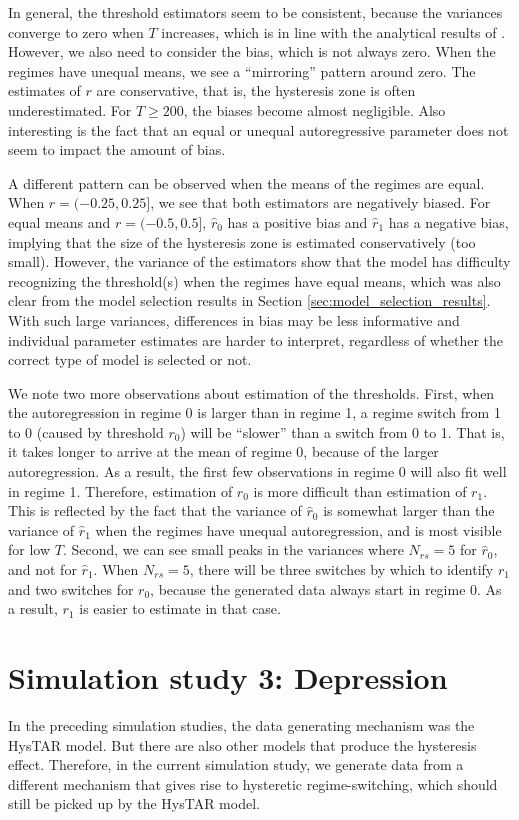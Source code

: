 \documentclass{article}
\begin{document}
In general, the threshold estimators seem to be consistent, because the variances converge to zero when $T$ increases, which is in line with the analytical results of \cite{bar2}.
However, we also need to consider the bias, which is not always zero. 
When the regimes have unequal means, we see a ``mirroring'' pattern around zero. 
The estimates of $r$ are conservative, that is, the hysteresis zone is often underestimated.
For $T\ge 200$, the biases become almost negligible.
Also interesting is the fact that an equal or unequal autoregressive parameter does not seem to impact the amount of bias.

A different pattern can be observed when the means of the regimes are equal. When $r = (-0.25, 0.25]$, we see that both estimators are negatively biased.
For equal means and $r = (-0.5, 0.5]$, $\hat{r}_0$ has a positive bias and $\hat{r}_1$ has a negative bias, implying that the size of the hysteresis zone is estimated conservatively (too small).
However, the variance of the estimators show that the model has difficulty recognizing the threshold(s) when the regimes have equal means, which was also clear from the model selection results in Section \ref{sec:model_selection_results}.
With such large variances, differences in bias may be less informative and individual parameter estimates are harder to interpret, regardless of whether the correct type of model is selected or not.

We note two more observations about estimation of the thresholds. 
First, when the autoregression in regime 0 is larger than in regime 1, a regime switch from 1 to 0 (caused by threshold $r_0$) will be ``slower'' than a switch from 0 to 1. That is, it takes longer to arrive at the mean of regime 0, because of the larger autoregression. 
As a result, the first few observations in regime 0 will also fit well in regime 1. Therefore, estimation of $r_0$ is more difficult than estimation of $r_1$. 
This is reflected by the fact that the variance of $\hat{r}_0$ is somewhat larger than the variance of $\hat{r}_1$ when the regimes have unequal autoregression, and is most visible for low $T$.
Second, we can see small peaks in the variances where $N_{rs} = 5$ for $\hat{r}_0$, and not for $\hat{r}_1$. 
When $N_{rs} = 5$, there will be three switches by which to identify $r_1$ and two switches for $r_0$, because the generated data always start in regime 0. As a result, $r_1$ is easier to estimate in that case.

\section{Simulation study 3: Depression} 
\label{sec:simulation_study_3}
In the preceding simulation studies, the data generating mechanism was the HysTAR model. 
But there are also other models that produce the hysteresis effect.
Therefore, in the current simulation study, we generate data from a different mechanism that gives rise to hysteretic regime-switching, which should still be picked up by the HysTAR model.
\end{document}
